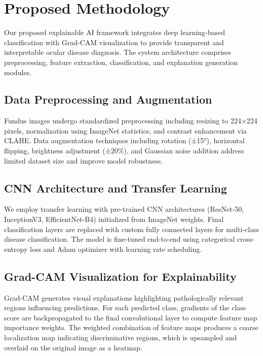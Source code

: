 \section{Proposed Methodology}
\label{sec:methodology}

Our proposed explainable AI framework integrates deep learning-based classification with Grad-CAM visualization to provide transparent and interpretable ocular disease diagnosis. The system architecture comprises preprocessing, feature extraction, classification, and explanation generation modules.

\subsection{Data Preprocessing and Augmentation}

Fundus images undergo standardized preprocessing including resizing to 224×224 pixels, normalization using ImageNet statistics, and contrast enhancement via CLAHE. Data augmentation techniques including rotation (±15°), horizontal flipping, brightness adjustment (±20\%), and Gaussian noise addition address limited dataset size and improve model robustness.

\subsection{CNN Architecture and Transfer Learning}

We employ transfer learning with pre-trained CNN architectures (ResNet-50, InceptionV3, EfficientNet-B4) initialized from ImageNet weights. Final classification layers are replaced with custom fully connected layers for multi-class disease classification. The model is fine-tuned end-to-end using categorical cross-entropy loss and Adam optimizer with learning rate scheduling.

\subsection{Grad-CAM Visualization for Explainability}

Grad-CAM generates visual explanations highlighting pathologically relevant regions influencing predictions. For each predicted class, gradients of the class score are backpropagated to the final convolutional layer to compute feature map importance weights. The weighted combination of feature maps produces a coarse localization map indicating discriminative regions, which is upsampled and overlaid on the original image as a heatmap.

